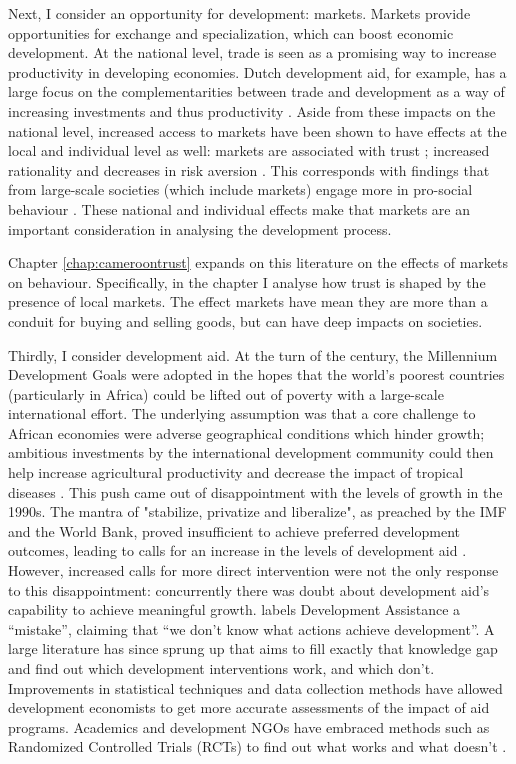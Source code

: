 Next, I consider an opportunity for development: markets. Markets provide opportunities for exchange and specialization, which can boost economic development. At the national level, trade is seen as a promising way to increase productivity in developing economies. Dutch development aid, for example, has a large focus on the complementarities between trade and development as a way of increasing investments and thus productivity \citep[see e.g.][]{Zoomers2014}. Aside from these impacts on the national level, increased access to markets have been shown to have effects at the local and individual level as well: markets are associated with trust \citep{Tu2010,Fischer2008}; increased rationality \citep{List2008,Cecchi2013,Braga2009} and decreases in risk aversion \citep{Melesse2015}. This corresponds with findings that from large-scale societies (which include markets) engage more in pro-social behaviour \cite{Henrich2005,Henrich2010}. These national and individual effects make that markets are an important consideration in analysing the development process. 

Chapter \ref{chap:cameroontrust} expands on this literature on the effects of markets on behaviour. Specifically, in the chapter I analyse how trust is shaped by the presence of local markets. The effect markets have mean they are more than a conduit for buying and selling goods, but can have deep impacts on societies.

Thirdly, I consider development aid. At the turn of the century, the Millennium Development Goals were adopted in the hopes that the world's poorest countries (particularly in Africa) could be lifted out of poverty with a large-scale international effort. The underlying assumption was that a core challenge to African economies were adverse geographical conditions which hinder growth; ambitious investments by the international development community could then help increase agricultural productivity and decrease the impact of tropical diseases \citep{Sachs2005}. This push came out of disappointment with the levels of growth in the 1990s. The mantra of "stabilize, privatize and liberalize", as preached by the IMF and the World Bank, proved insufficient to achieve preferred development outcomes, leading to calls  for an increase in the levels of development aid \citep{Rodrik2006a}. However, increased calls for more direct intervention were not the only response to this disappointment: concurrently there was doubt about development aid's capability to achieve meaningful growth. \citet{Easterly2007} labels Development Assistance a ``mistake'', claiming that ``we don't know what actions achieve development''. A large literature has since sprung up that aims to fill exactly that knowledge gap and find out which development interventions work, and which don't. Improvements in statistical techniques and data collection methods have allowed development economists to get more accurate assessments of the impact of aid programs. Academics and development NGOs have embraced methods such as Randomized Controlled Trials (RCTs) to find out what works and what doesn't \citep[see e.g.][]{Bannerjee2011}.  


